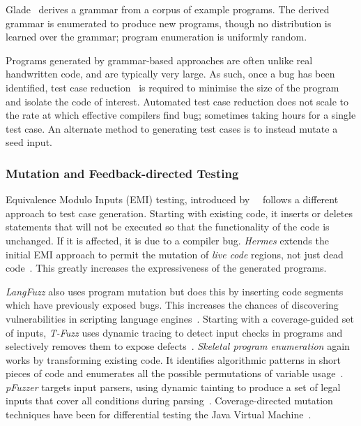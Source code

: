 Glade~\cite{Bastani2017} derives a grammar from a corpus of example programs. The derived grammar is enumerated to produce new programs, though no distribution is learned over the grammar; program enumeration is uniformly random.

Programs generated by grammar-based approaches are often unlike real handwritten code, and are typically very large. As such, once a bug has been identified, test case reduction~\cite{Regehr2012a} is required to minimise the size of the program and isolate the code of interest. Automated test case reduction does not scale to the rate at which effective compilers find bug; sometimes taking hours for a single test case. An alternate method to generating test cases is to instead mutate a seed input.


\subsubsection{Mutation and Feedback-directed Testing}

Equivalence Modulo Inputs (EMI) testing, introduced by~\citeauthor{Le2013a}~\cite{Le2013a} follows a different approach to test case generation. Starting with existing code, it inserts or deletes statements that will not be executed so that the functionality of the code is unchanged. If it is affected, it is due to a compiler bug. \emph{Hermes} extends the initial EMI approach to permit the mutation of \emph{live code} regions, not just dead code~\cite{Sun2016a}. This greatly increases the expressiveness of the generated programs.

\emph{LangFuzz} also uses program mutation but does this by inserting code segments which have previously exposed bugs. This increases the chances of discovering vulnerabilities in scripting language engines~\cite{Holler2012}.
Starting with a coverage-guided set of inputs, \emph{T-Fuzz} uses dynamic tracing to detect input checks in programs and selectively removes them to expose defects~\cite{Peng2018}.
\emph{Skeletal program enumeration} again works by transforming existing code. It identifies algorithmic patterns in short pieces of code and enumerates all the possible permutations of variable usage~\cite{Zhang2017a}.
\emph{pFuzzer} targets input parsers, using dynamic tainting to produce a set of legal inputs that cover all conditions during parsing~\cite{Mathis2019}.
Coverage-directed mutation techniques have been for differential testing the Java Virtual Machine~\cite{Chen2016b}.

